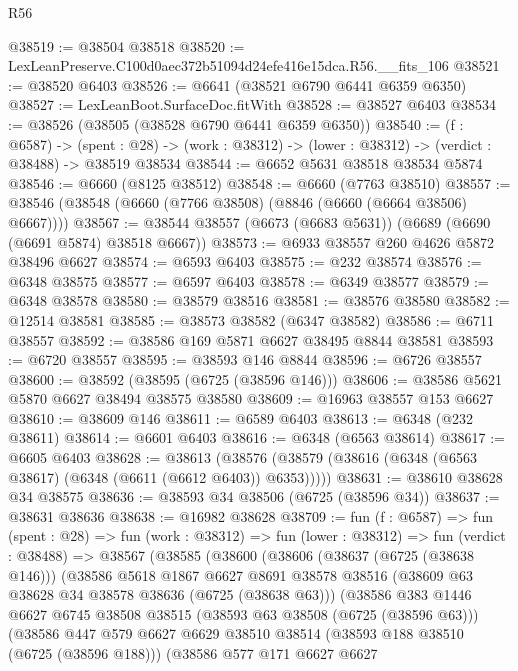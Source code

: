 \begin{lexlean}{R56}
\begin{coremodule}
@38519 := @38504 @38518
@38520 := LexLeanPreserve.C100d0aec372b51094d24efe416e15dca.R56.__fits_106
@38521 := @38520 @6403
@38526 := @6641 (@38521 @6790 @6441 @6359 @6350)
@38527 := LexLeanBoot.SurfaceDoc.fitWith
@38528 := @38527 @6403
@38534 := @38526 (@38505 (@38528 @6790 @6441 @6359 @6350))
@38540 := (f : @6587) ->
  (spent : @28) -> (work : @38312) -> (lower : @38312) -> (verdict : @38488) -> @38519 @38534
@38544 := @6652 @5631 @38518 @38534 @5874
@38546 := @6660 (@8125 @38512)
@38548 := @6660 (@7763 @38510)
@38557 := @38546 (@38548 (@6660 (@7766 @38508) (@8846 (@6660 (@6664 @38506) @6667))))
@38567 := @38544 @38557 (@6673 (@6683 @5631)) (@6689 (@6690 (@6691 @5874) @38518 @6667))
@38573 := @6933 @38557 @260 @4626 @5872 @38496 @6627
@38574 := @6593 @6403
@38575 := @232 @38574
@38576 := @6348 @38575
@38577 := @6597 @6403
@38578 := @6349 @38577
@38579 := @6348 @38578
@38580 := @38579 @38516
@38581 := @38576 @38580
@38582 := @12514 @38581
@38585 := @38573 @38582 (@6347 @38582)
@38586 := @6711 @38557
@38592 := @38586 @169 @5871 @6627 @38495 @8844 @38581
@38593 := @6720 @38557
@38595 := @38593 @146 @8844
@38596 := @6726 @38557
@38600 := @38592 (@38595 (@6725 (@38596 @146)))
@38606 := @38586 @5621 @5870 @6627 @38494 @38575 @38580
@38609 := @16963 @38557 @153 @6627
@38610 := @38609 @146
@38611 := @6589 @6403
@38613 := @6348 (@232 @38611)
@38614 := @6601 @6403
@38616 := @6348 (@6563 @38614)
@38617 := @6605 @6403
@38628 := @38613
    (@38576 (@38579 (@38616 (@6348 (@6563 @38617) (@6348 (@6611 (@6612 @6403)) @6353)))))
@38631 := @38610 @38628 @34 @38575
@38636 := @38593 @34 @38506 (@6725 (@38596 @34))
@38637 := @38631 @38636
@38638 := @16982 @38628
@38709 := fun (f : @6587) =>
  fun (spent : @28) =>
  fun (work : @38312) =>
  fun (lower : @38312) =>
  fun (verdict : @38488) =>
  @38567
    (@38585
      (@38600
        (@38606
          (@38637 (@6725 (@38638 @146)))
          (@38586
            @5618
            @1867
            @6627
            @8691
            @38578
            @38516
            (@38609 @63 @38628 @34 @38578 @38636 (@6725 (@38638 @63)))
            (@38586
              @383
              @1446
              @6627
              @6745
              @38508
              @38515
              (@38593 @63 @38508 (@6725 (@38596 @63)))
              (@38586
                @447
                @579
                @6627
                @6629
                @38510
                @38514
                (@38593 @188 @38510 (@6725 (@38596 @188)))
                (@38586
                  @577
                  @171
                  @6627
                  @6627

\end{coremodule}
\end{lexlean}
